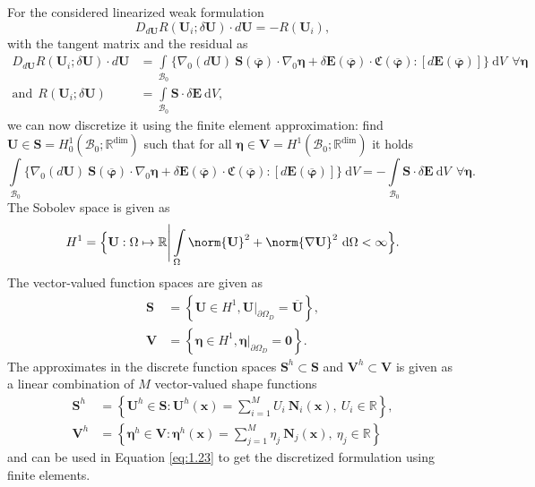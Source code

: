 \documentclass[11pt,a4paper,final]{article}
\begin{document}
\noindent For the considered linearized weak formulation 
\begin{equation}
D_{d\mathbf{U}} R(\mathbf{U}_i; \delta \mathbf{U}) \cdot d\mathbf{U} = -R(\mathbf{U}_{i}) ,
\label{eq:1.24}
\end{equation}
with the tangent matrix and the residual as
\begin{align*}
D_{d\mathbf{U}} R(\mathbf{U}_i; \delta \mathbf{U}) \cdot d\mathbf{U} &= \int\limits_{\mathcal{B}_0} \Big\lbrace \nabla_0 (d\mathbf{U}) \ \mathbf{S}(\overline{\bm{\varphi}}) \cdot \nabla_0 \bm{\eta} + \delta \mathbf{E}(\overline{\bm{\varphi}}) \cdot \mathfrak{C}(\overline{\bm{\varphi}}) : \left[ d\mathbf{E}(\overline{\bm{\varphi}}) \right] \Big\rbrace \ \mathrm{d}V \ \ \forall \bm{\eta} \\
\text{and} \ \ R(\mathbf{U}_i; \delta \mathbf{U}) &= \int\limits_{\mathcal{B}_0} \mathbf{S} \cdot \delta \mathbf{E} \ \mathrm{d}V,
\end{align*}
we can now discretize it using the finite element approximation: find $\mathbf{U} \in \mathbf{S} = H^1_0 (\mathcal{B}_0; \mathbb{R}^{\text{dim}})$ such that for all $\bm{\eta} \in \mathbf{V} = H^1 (\mathcal{B}_0; \mathbb{R}^{\text{dim}})$ it holds
\begin{equation}
\int\limits_{\mathcal{B}_0} \Big\lbrace \nabla_0 (d\mathbf{U}) \ \mathbf{S}(\overline{\bm{\varphi}}) \cdot \nabla_0 \bm{\eta} + \delta \mathbf{E}(\overline{\bm{\varphi}}) \cdot \mathfrak{C}(\overline{\bm{\varphi}}) : \left[ d\mathbf{E}(\overline{\bm{\varphi}}) \right] \Big\rbrace \ \mathrm{d}V = -\int\limits_{\mathcal{B}_0} \mathbf{S} \cdot \delta \mathbf{E} \ \mathrm{d}V \ \ \forall \bm{\eta}.
\label{eq:1.23}
\end{equation}
The Sobolev space is given as 
\begin{equation}
H^1 = \Big\lbrace \mathbf{U}: \Omega \mapsto \mathbb{R} \Bigg| \int\limits_{\Omega} \norm{\mathbf{U}}^2 + \norm{\nabla \mathbf{U}}^2 \ \mathrm{d}\Omega < \infty \Big\rbrace.
\end{equation}
The vector-valued function spaces are given as 
\begin{align}
\mathbf{S} &= \left\lbrace \mathbf{U} \in H^1, \mathbf{U} \big|_{\partial \Omega_D} = \overline{\mathbf{U}} \right\rbrace, \\
\mathbf{V} &= \left\lbrace \bm{\eta} \in H^1, \bm{\eta} \big|_{\partial \Omega_D} = \mathbf{0} \right\rbrace.
\end{align}
The approximates in the discrete function spaces $\mathbf{S}^h \subset \mathbf{S}$ and $\mathbf{V}^h \subset \mathbf{V}$ is given as a linear combination of $M$ vector-valued shape functions
\begin{align}
\mathbf{S}^h &= \left\lbrace \mathbf{U}^h \in \mathbf{S} : \mathbf{U}^h (\mathbf{x}) = \sum\limits_{i=1}^{M} U_i \ \mathbf{N}_i (\mathbf{x}), \ U_i \in \mathbb{R} \right\rbrace, \nonumber\\
\mathbf{V}^h &= \left\lbrace \bm{\eta}^h \in \mathbf{V} : \bm{\eta}^h (\mathbf{x}) = \sum\limits_{j=1}^{M} \eta_j \ \mathbf{N}_j (\mathbf{x}), \ \eta_j \in \mathbb{R} \right\rbrace
\end{align}
and can be used in Equation \eqref{eq:1.23} to get the discretized formulation using finite elements.
\end{document}
